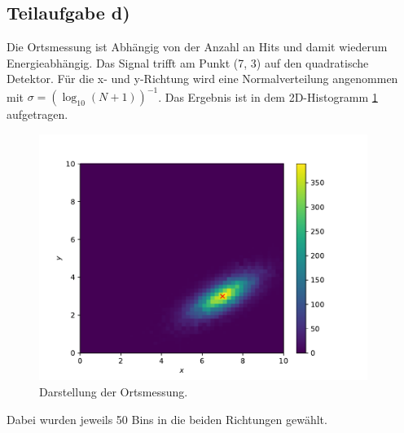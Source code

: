 \subsection{Teilaufgabe d)}
Die Ortsmessung ist Abhängig von der Anzahl an Hits und damit wiederum Energieabhängig.
Das Signal trifft am Punkt (7, 3) auf den quadratische Detektor. Für die x- und y-Richtung
wird eine Normalverteilung angenommen mit $\sigma=(\log_{10}(N+1))^{-1}$.
Das Ergebnis ist in dem 2D-Histogramm \ref{fig:Ort} aufgetragen.
\begin{figure}[h]
  \centering
  \includegraphics[height = 8cm]{plots/Ort.pdf}
  \caption{Darstellung der Ortsmessung.}
  \label{fig:Ort}
\end{figure}
Dabei wurden jeweils 50 Bins in die beiden Richtungen gewählt.
